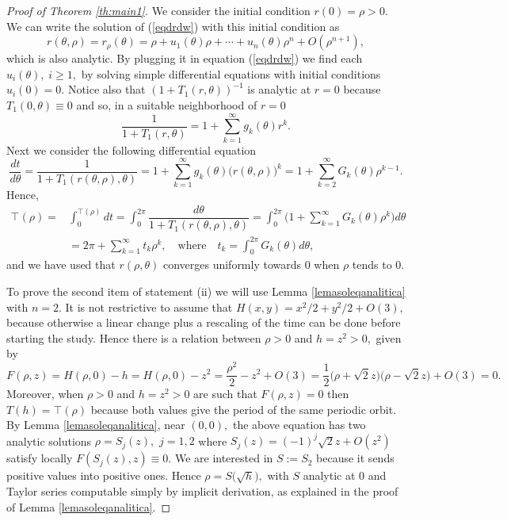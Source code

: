 \documentclass[12pt,a4paper,reqno]{amsart}
\begin{document}
\begin{proof}[Proof of Theorem \ref{th:main1}]
    We consider the initial condition $ r (0) = \rho> 0.$
    We can write the solution of (\ref{eqdrdw}) with this initial condition as
    \begin{equation*}
    r(\theta ,\rho)=r_{\rho}(\theta )= \rho + u_1(\theta ) \rho + \cdots + u_{n}(\theta ) \rho^{n} + O(\rho^{n+1}),
    \end{equation*}
    which is also analytic. By plugging it in equation (\ref{eqdrdw}) we
    find
    each $ u_i (\theta ), \; i\ge1,$ by solving simple differential equations with initial conditions
    $u_i(0)=0.$ Notice also that $(1 + T_1(r,\theta ))^{-1}$ is
    analytic at $r=0$ because $T_1(0,\theta)\equiv0$ and so, in a
    suitable neighborhood of $r=0$
    \begin{equation*}%
    \frac{1}{1+T_1(r,\theta )}=1 + \displaystyle\sum_{k=1}^{\infty} g_k(\theta ) r^k.
    \end{equation*}
  Next we consider the following differential equation
\begin{equation*}
    \dfrac{d t }{d\theta} = \frac1{1 + T_1(r(\theta ,\rho),\theta )} =1+ \displaystyle\sum_{k=1}^{\infty} g_k(\theta )\big( r(\theta,\rho)\big)^{k}
    =
1+ \displaystyle\sum_{k=2}^{\infty} G_k(\theta )\rho^{k-1} .
    \end{equation*}
Hence,
    \begin{align*}
    \top(\rho)=&\displaystyle\int_0^{\top(\rho)}
    dt =\displaystyle\int_0^{2 \pi} \dfrac{d\theta }{1+T_1(r(\theta ,\rho),\theta
    )}= \displaystyle\int_0^{2 \pi} \Big(1 +
\displaystyle\sum_{k=1}^{\infty} G_k(\theta )
    \rho^k \Big) d\theta\\ &= 2 \pi + \displaystyle\sum_{k=1}^{\infty} t_k
    \rho^k,\quad \text{where}\quad  t_k=\displaystyle\int_0^{2
    \pi} G_k(\theta ) d\theta,
\end{align*}
and we have used that $r(\rho,\theta)$ converges uniformly towards
$0$ when $\rho$ tends to $0.$

To prove the second item of statement (ii) we will use Lemma
\ref{lemasoleqanalitica} with $n=2.$ It is not restrictive to assume
that $H(x,y)=x^2/2+y^2/2+O(3),$ because otherwise a linear change
plus a rescaling of the time can be done before starting the study.
Hence there is a relation between $\rho>0$  and $h=z^2>0,$ given by
\[
F(\rho,z)=H(\rho,0)-h=H(\rho,0)-z^2=\frac{\rho^2}2-z^2+O(3)=
\frac12\big(\rho+\sqrt 2 z\big)\big(\rho-\sqrt2 z\big)+O(3)=0.
\]
Moreover, when $\rho>0$ and $h=z^2>0$ are such that $F(\rho,z)=0$
then  $T(h)=\top(\rho)$ because both values give the period of the
same periodic orbit. By Lemma \ref{lemasoleqanalitica}, near
$(0,0),$ the above equation has two analytic solutions
$\rho=S_j(z),$ $j=1,2$ where $S_j(z)=(-1)^j\sqrt2 z+O(z^2)$ satisfy
locally $F(S_j(z),z)\equiv 0.$ We are interested in $S:=S_2$ because
it sends positive values into positive ones. Hence $\rho=S\big(\sqrt
h\big),$ with $S$ analytic at $0$ and Taylor series computable
simply by implicit derivation, as explained in the proof of  Lemma
\ref{lemasoleqanalitica}.


\end{proof}
\end{document}
